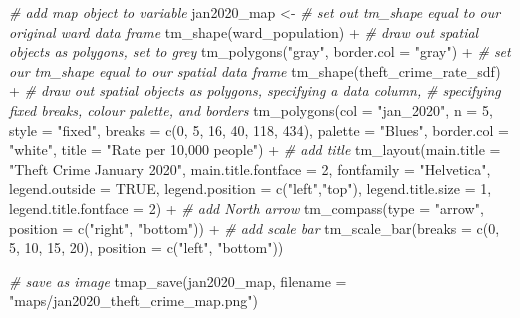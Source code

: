 \documentclass[
]{book}
\newenvironment{Shaded}{\begin{snugshade}}{\end{snugshade}}
\newcommand{\AttributeTok}[1]{\textcolor[rgb]{0.77,0.63,0.00}{#1}}
\newcommand{\CommentTok}[1]{\textcolor[rgb]{0.56,0.35,0.01}{\textit{#1}}}
\newcommand{\ConstantTok}[1]{\textcolor[rgb]{0.00,0.00,0.00}{#1}}
\newcommand{\DecValTok}[1]{\textcolor[rgb]{0.00,0.00,0.81}{#1}}
\newcommand{\FunctionTok}[1]{\textcolor[rgb]{0.00,0.00,0.00}{#1}}
\newcommand{\NormalTok}[1]{#1}
\newcommand{\OtherTok}[1]{\textcolor[rgb]{0.56,0.35,0.01}{#1}}
\newcommand{\SpecialCharTok}[1]{\textcolor[rgb]{0.00,0.00,0.00}{#1}}
\newcommand{\StringTok}[1]{\textcolor[rgb]{0.31,0.60,0.02}{#1}}
\begin{document}
\begin{Shaded}
\begin{Highlighting}[]
\CommentTok{\# add map object to variable}
\NormalTok{jan2020\_map }\OtherTok{\textless{}{-}} 
  \CommentTok{\# set out tm\_shape equal to our original ward data frame}
  \FunctionTok{tm\_shape}\NormalTok{(ward\_population) }\SpecialCharTok{+} 
  \CommentTok{\# draw out spatial objects as polygons, set to grey}
  \FunctionTok{tm\_polygons}\NormalTok{(}\StringTok{"gray"}\NormalTok{, }\AttributeTok{border.col =} \StringTok{"gray"}\NormalTok{) }\SpecialCharTok{+} 
\CommentTok{\# set our tm\_shape equal to our spatial data frame}
\FunctionTok{tm\_shape}\NormalTok{(theft\_crime\_rate\_sdf) }\SpecialCharTok{+} 
  \CommentTok{\# draw out spatial objects as polygons, specifying a data column, }
  \CommentTok{\# specifying fixed breaks, colour palette, and borders}
  \FunctionTok{tm\_polygons}\NormalTok{(}\AttributeTok{col =} \StringTok{"jan\_2020"}\NormalTok{, }\AttributeTok{n =} \DecValTok{5}\NormalTok{, }\AttributeTok{style =} \StringTok{"fixed"}\NormalTok{, }
              \AttributeTok{breaks =} \FunctionTok{c}\NormalTok{(}\DecValTok{0}\NormalTok{, }\DecValTok{5}\NormalTok{, }\DecValTok{16}\NormalTok{, }\DecValTok{40}\NormalTok{, }\DecValTok{118}\NormalTok{, }\DecValTok{434}\NormalTok{), }
              \AttributeTok{palette =} \StringTok{"Blues"}\NormalTok{, }\AttributeTok{border.col =} \StringTok{"white"}\NormalTok{, }
              \AttributeTok{title =} \StringTok{"Rate per 10,000 people"}\NormalTok{) }\SpecialCharTok{+} 
  \CommentTok{\# add title}
  \FunctionTok{tm\_layout}\NormalTok{(}\AttributeTok{main.title =} \StringTok{"Theft Crime January 2020"}\NormalTok{, }
            \AttributeTok{main.title.fontface =} \DecValTok{2}\NormalTok{, }
            \AttributeTok{fontfamily =} \StringTok{"Helvetica"}\NormalTok{, }
            \AttributeTok{legend.outside =} \ConstantTok{TRUE}\NormalTok{, }
            \AttributeTok{legend.position =} \FunctionTok{c}\NormalTok{(}\StringTok{"left"}\NormalTok{,}\StringTok{"top"}\NormalTok{), }
            \AttributeTok{legend.title.size =} \DecValTok{1}\NormalTok{, }
            \AttributeTok{legend.title.fontface =} \DecValTok{2}\NormalTok{) }\SpecialCharTok{+}
  \CommentTok{\# add North arrow}
  \FunctionTok{tm\_compass}\NormalTok{(}\AttributeTok{type =} \StringTok{"arrow"}\NormalTok{, }
             \AttributeTok{position =} \FunctionTok{c}\NormalTok{(}\StringTok{"right"}\NormalTok{, }\StringTok{"bottom"}\NormalTok{)) }\SpecialCharTok{+} 
  \CommentTok{\# add scale bar}
  \FunctionTok{tm\_scale\_bar}\NormalTok{(}\AttributeTok{breaks =} \FunctionTok{c}\NormalTok{(}\DecValTok{0}\NormalTok{, }\DecValTok{5}\NormalTok{, }\DecValTok{10}\NormalTok{, }\DecValTok{15}\NormalTok{, }\DecValTok{20}\NormalTok{), }
               \AttributeTok{position =} \FunctionTok{c}\NormalTok{(}\StringTok{"left"}\NormalTok{, }\StringTok{"bottom"}\NormalTok{))}

\CommentTok{\# save as image}
\FunctionTok{tmap\_save}\NormalTok{(jan2020\_map, }\AttributeTok{filename =} \StringTok{"maps/jan2020\_theft\_crime\_map.png"}\NormalTok{)}
\end{Highlighting}
\end{Shaded}
\end{document}
